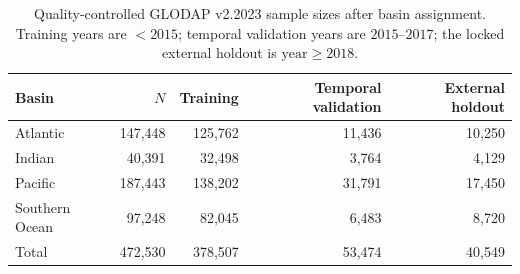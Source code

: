 \begin{table}[htbp]
\centering
\caption{Quality-controlled GLODAP v2.2023 sample sizes after basin assignment. Training years are $<2015$; temporal validation years are $2015$--$2017$; the locked external holdout is $\mathrm{year}\ge 2018$.}
\label{tab:sample_sizes}
\begin{tabular}{lrrrr}
\toprule
Basin & $N$ & Training & Temporal validation & External holdout \\
\midrule
Atlantic & 147{,}448 & 125{,}762 & 11{,}436 & 10{,}250 \\
Indian & 40{,}391 & 32{,}498 & 3{,}764 & 4{,}129 \\
Pacific & 187{,}443 & 138{,}202 & 31{,}791 & 17{,}450 \\
Southern Ocean & 97{,}248 & 82{,}045 & 6{,}483 & 8{,}720 \\
Total & 472{,}530 & 378{,}507 & 53{,}474 & 40{,}549 \\
\bottomrule
\end{tabular}
\end{table}
